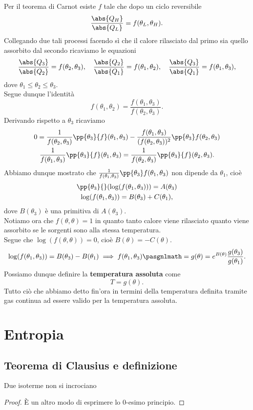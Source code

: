 \noindent
Per il teorema di Carnot esiste $f$ tale che dopo un ciclo reversibile
\[\frac{\abs{Q_H}}{\abs{Q_L}}=f(\theta_L,\theta_H).\]
Collegando due tali processi facendo s\`i che il calore rilasciato dal primo sia quello assorbito dal secondo ricaviamo le equazioni
\[\frac{\abs{Q_3}}{\abs{Q_2}}=f(\theta_2,\theta_3),\quad\frac{\abs{Q_2}}{\abs{Q_1}}=f(\theta_1,\theta_2),\quad \frac{\abs{Q_3}}{\abs{Q_1}}=f(\theta_1,\theta_3),\]
dove $\theta_1\leq \theta_2\leq \theta_3$.\\
Segue dunque l'identit\`a
\[f(\theta_1,\theta_2)=\frac{f(\theta_1,\theta_3)}{f(\theta_2,\theta_3)}.\]
Derivando rispetto a $\theta_3$ ricaviamo
\begin{gather*}
0=\frac1{f(\theta_2,\theta_3)}\pp{\theta_3}{f}(\theta_1,\theta_3)-\frac{f(\theta_1,\theta_3)}{(f(\theta_2,\theta_3))^2}\pp{\theta_3}f(\theta_2,\theta_3)\\
\frac1{f(\theta_1,\theta_3)}\pp{\theta_3}{f}(\theta_1,\theta_3)=\frac1{f(\theta_2,\theta_3)}\pp{\theta_3}{f}(\theta_2,\theta_3).
\end{gather*}
Abbiamo dunque mostrato che $\frac1{f(\theta_1,\theta_3)}\pp{\theta_3}f(\theta_1,\theta_3)$ non dipende da $\theta_1$, cio\`e
\begin{gather*}
\pp{\theta_3}{}(\log(f(\theta_1,\theta_3)))=A(\theta_3)\\
\log(f(\theta_1,\theta_3))=B(\theta_3)+C(\theta_1),
\end{gather*}
dove $B(\theta_3)$ \`e una primitiva di $A(\theta_3)$.\\
Notiamo ora che $f(\theta,\theta)=1$ in quanto tanto calore viene rilasciato quanto viene assorbito se le sorgenti sono alla stessa temperatura.\\ 
Segue che $\log(f(\theta,\theta))=0$, cio\`e $B(\theta)=-C(\theta)$.
\[\log(f(\theta_1,\theta_3))=B(\theta_3)-B(\theta_1)\implies f(\theta_1,\theta_3)\pasgnlmath={g(\theta)=e^{B(\theta)}}\frac{g(\theta_3)}{g(\theta_1)}.\]
Possiamo dunque definire la \textbf{temperatura assoluta} come
\[T=g(\theta).\]
Tutto ci\`o che abbiamo detto fin'ora in termini della temperatura definita tramite gas continua ad essere valido per la temperatura assoluta.




\section{Entropia}
\subsection{Teorema di Clausius e definizione}
\begin{lemma}\label{IsotermeFibrano}
Due isoterme non si incrociano
\end{lemma}
\begin{proof}
\`E un altro modo di esprimere lo 0-esimo principio.
\end{proof}

